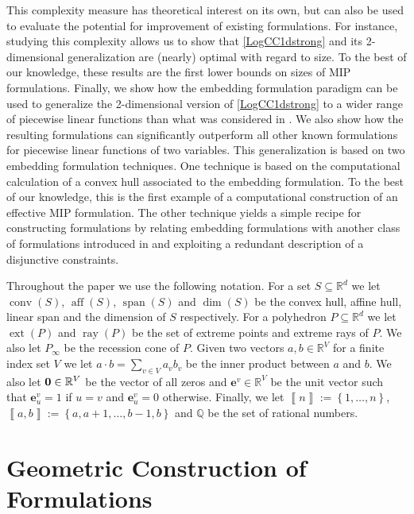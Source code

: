 \documentclass[mnsc]{informs3}
\newcommand{\set}[1]{\left\{#1\right\}}                     %
\newcommand{\bra}[1]{\left(#1\right)}
\newcommand{\sidx}[1]{\left\llbracket     #1 \right\rrbracket}
\newcommand{\Real}{\mathbb R}
\newcommand{\e}{\mathbf{e}}
\DeclareMathOperator{\conv}{conv}
\DeclareMathOperator{\ext}{ext}
\DeclareMathOperator{\ray}{ray}
\DeclareMathOperator{\aff}{aff}
\DeclareMathOperator{\spann}{span}
\begin{document}
This complexity measure has theoretical interest on its own, but can also be used to evaluate the potential for improvement of existing formulations. For instance, studying this complexity allows us to show that \eqref{LogCC1dstrong} and its 2-dimensional generalization are (nearly) optimal with regard to size. To the best of our knowledge, these results are the first lower bounds on sizes of MIP formulations. Finally, we show how the embedding formulation paradigm can be used to generalize the 2-dimensional version of \eqref{LogCC1dstrong} to a wider range of piecewise linear functions than what was considered in  \cite{Modeling-Disjunctive-Constraints-FULL}. We also show how the resulting formulations can significantly outperform all other known formulations for piecewise linear functions of two variables. This generalization is based on two embedding formulation techniques. One technique is based on the computational calculation of a convex hull associated to the embedding formulation. To the best of our knowledge, this is the first example of a computational construction of an effective MIP formulation. The other technique yields a simple recipe for constructing formulations by relating embedding formulations with another class of formulations introduced in \cite{Modeling-Disjunctive-Constraints-FULL} and exploiting a redundant description of a disjunctive constraints. 

Throughout  the paper we use the following notation. For a set $S\subseteq \Real^d$ we let $\conv\bra{S}$, $\aff\bra{S}$, $\spann\bra{S}$ and $\dim\bra{S}$ be the convex hull, affine hull, linear span and the dimension of $S$ respectively. For a polyhedron $P\subseteq \Real^d$ we let $\ext\bra{P}$ and $\ray\bra{P}$ be the set of extreme points and extreme rays of $P$. We also let $P_\infty$ be the recession cone of $P$. Given two vectors $a, b\in \Real^V$ for a finite index set $V$ we let $a\cdot b=\sum\nolimits_{v\in V} a_v b_v$ be the inner product between $a$ and $b$. We also let ${\bf 0}\in \Real^V$ be the vector of all zeros and  $\e^v\in \Real^V$ be the unit vector such that $\e^v_u=1$ if $u=v$ and $\e^v_u=0$ otherwise. Finally, we let $\sidx{n}:=\set{1,\ldots,n}$, $\sidx{a,b}:=\set{a,a+1,\ldots, b-1,b}$ and $\mathbb{Q}$ be the set of rational numbers. 


\section{Geometric Construction of Formulations}\label{formulationsec}
\end{document}
